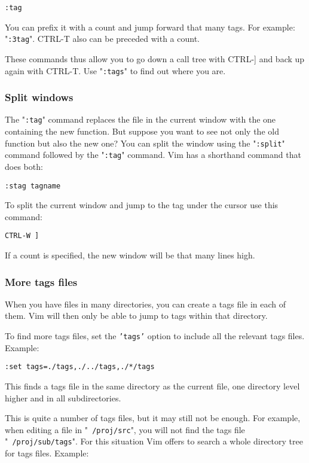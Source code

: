 \begin{Verbatim}[samepage=true]
 :tag
\end{Verbatim}

You can prefix it with a count and jump forward that many tags.
For example: "\texttt{:3tag}".
CTRL-T also can be preceded with a count.

These commands thus allow you to go down a call tree with CTRL-] and back up again with CTRL-T.
Use "\texttt{:tags}" to find out where you are.
\subsubsection{Split windows}
The "\texttt{:tag}" command replaces the file in the current window with the one containing the new function.
But suppose you want to see not only the old function but also the new one?  You can split the window using the "\texttt{:split}" command followed by the "\texttt{:tag}" command.
Vim has a shorthand command that does both:

\begin{Verbatim}[samepage=true]
 :stag tagname
\end{Verbatim}

To split the current window and jump to the tag under the cursor use this command:

\begin{Verbatim}[samepage=true]
 CTRL-W ]
\end{Verbatim}

If a count is specified, the new window will be that many lines high.
\subsubsection{More tags files}
When you have files in many directories, you can create a tags file in each of them.
Vim will then only be able to jump to tags within that directory.

To find more tags files, set the \texttt{'tags'} option to include all the relevant tags files.
Example:

\begin{Verbatim}[samepage=true]
 :set tags=./tags,./../tags,./*/tags
\end{Verbatim}

This finds a tags file in the same directory as the current file, one directory level higher and in all subdirectories.

This is quite a number of tags files, but it may still not be enough.
For example, when editing a file in "\texttt{~/proj/src}", you will not find the tags file "\texttt{~/proj/sub/tags}".
For this situation Vim offers to search a whole directory tree for tags files.
Example:

